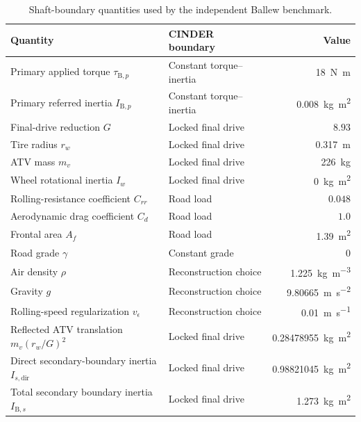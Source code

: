 \documentclass[11pt]{report}
\numberwithin{equation}{section}
\begin{document}
\begin{table}[H]
\centering
\small
\begin{tabular}{@{}>{\raggedright\arraybackslash}p{}>{\raggedright\arraybackslash}p{}r@{}}
\toprule
Quantity & CINDER boundary & Value \\
\midrule
Primary applied torque \(\tau_{\mathrm{B},p}\) & Constant torque--inertia & \SI{18}{\newton\meter} \\
Primary referred inertia \(I_{\mathrm{B},p}\) & Constant torque--inertia & \SI{0.008}{\kilogram\meter\squared} \\
Final-drive reduction \(G\) & Locked final drive & \(8.93\) \\
Tire radius \(r_w\) & Locked final drive & \SI{0.317}{\meter} \\
ATV mass \(m_v\) & Locked final drive & \SI{226}{\kilogram} \\
Wheel rotational inertia \(I_w\) & Locked final drive & \SI{0}{\kilogram\meter\squared} \\
Rolling-resistance coefficient \(C_{rr}\) & Road load & \(0.048\) \\
Aerodynamic drag coefficient \(C_d\) & Road load & \(1.0\) \\
Frontal area \(A_f\) & Road load & \SI{1.39}{\meter\squared} \\
Road grade \(\gamma\) & Constant grade & \(0\) \\
Air density \(\rho\) & Reconstruction choice & \SI{1.225}{\kilogram\per\meter\cubed} \\
Gravity \(g\) & Reconstruction choice & \SI{9.80665}{\meter\per\second\squared} \\
Rolling-speed regularization \(v_\epsilon\) & Reconstruction choice & \SI{0.01}{\meter\per\second} \\
Reflected ATV translation \(m_v(r_w/G)^2\) & Locked final drive & \SI{0.28478955}{\kilogram\meter\squared} \\
Direct secondary-boundary inertia \(I_{s,\mathrm{dir}}\) & Locked final drive & \SI{0.98821045}{\kilogram\meter\squared} \\
Total secondary boundary inertia \(I_{\mathrm{B},s}\) & Locked final drive & \SI{1.273}{\kilogram\meter\squared} \\
\bottomrule
\end{tabular}
\caption{Shaft-boundary quantities used by the independent Ballew benchmark.}
\label{tab:ballew_boundary_values}
\end{table}
\end{document}
